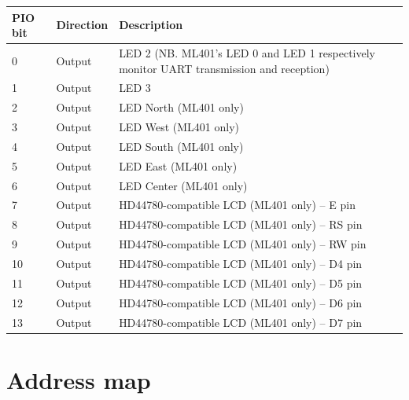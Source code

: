 \documentclass[a4paper,11pt]{article}
\begin{document}
\begin{tabularx}{\textwidth}{|l|l|X|}
\hline
\bf{PIO bit} & \bf{Direction} & \bf{Description} \\
\hline
0 & Output & LED 2 (NB. ML401's LED 0 and LED 1 respectively monitor UART transmission and reception) \\
\hline
1 & Output & LED 3 \\
\hline
2 & Output & LED North (ML401 only) \\
\hline
3 & Output & LED West (ML401 only) \\
\hline
4 & Output & LED South (ML401 only) \\
\hline
5 & Output & LED East (ML401 only) \\
\hline
6 & Output & LED Center (ML401 only) \\
\hline
7 & Output & HD44780-compatible LCD (ML401 only) -- E pin \\
\hline
8 & Output & HD44780-compatible LCD (ML401 only) -- RS pin \\
\hline
9 & Output & HD44780-compatible LCD (ML401 only) -- RW pin \\
\hline
10 & Output & HD44780-compatible LCD (ML401 only) -- D4 pin \\
\hline
11 & Output & HD44780-compatible LCD (ML401 only) -- D5 pin \\
\hline
12 & Output & HD44780-compatible LCD (ML401 only) -- D6 pin \\
\hline
13 & Output & HD44780-compatible LCD (ML401 only) -- D7 pin \\
\hline
\end{tabularx}

\section{Address map}
\end{document}
